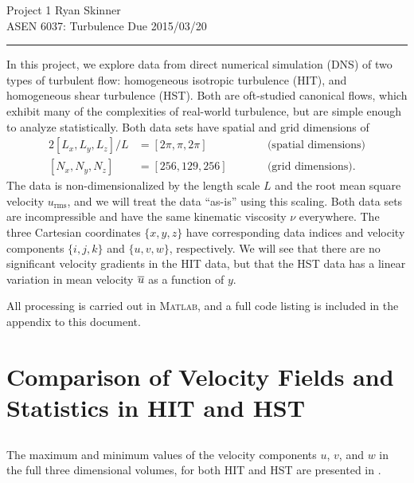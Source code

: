 \documentclass[11pt]{article}
\begin{document}
\pagestyle{fancyplain}
\lhead{}
\chead{}
\rhead{}
\cfoot{\thepage}

\noindent
{\Large \color{blue} Project 1}
\hfill
{\large Ryan Skinner}
\\[0.5ex]
{\large ASEN 6037: Turbulence}
\hfill
{\large Due 2015/03/20}
\hrule
\vspace{12pt}

In this project, we explore data from direct numerical simulation (DNS) of two types of turbulent flow: homogeneous isotropic turbulence (HIT), and homogeneous shear turbulence (HST). Both are oft-studied canonical flows, which exhibit many of the complexities of real-world turbulence, but are simple enough to analyze statistically. Both data sets have spatial and grid dimensions of
\begin{alignat*}{2}
[ L_x, L_y, L_z ] / L &= [ 2\pi, \pi, 2\pi ]
\qquad && \text{(spatial dimensions)}
\\
[ N_x, N_y, N_z ] &= [ 256, 129, 256 ]
\qquad && \text{(grid dimensions)}
.
\end{alignat*}
The data is non-dimensionalized by the length scale $L$ and the root mean square velocity $u_\text{rms}$, and we will treat the data ``as-is'' using this scaling. Both data sets are incompressible and have the same kinematic viscosity $\nu$ everywhere. The three Cartesian coordinates $\{x, y, z\}$ have corresponding data indices and velocity components $\{i, j, k\}$ and $\{u, v, w\}$, respectively. We will see that there are no significant velocity gradients in the HIT data, but that the HST data has a linear variation in mean velocity $\overline{u}$ as a function of $y$.

All processing is carried out in \textsc{Matlab}, and a full code listing is included in the appendix to this document.

\section{Comparison of Velocity Fields and Statistics in HIT and HST}

\subsection{}

The maximum and minimum values of the velocity components $u$, $v$, and $w$ in the full three dimensional volumes, for both HIT and HST are presented in .
\end{document}
